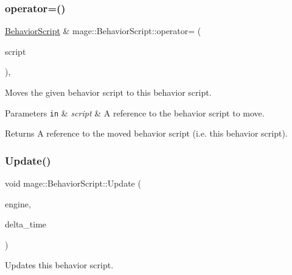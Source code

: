 \subsubsection{\texorpdfstring{operator=()}{operator=()}\hspace{0.1cm}{\footnotesize\ttfamily [2/2]}}
{\footnotesize\ttfamily \hyperlink{classmage_1_1_behavior_script}{Behavior\+Script} \& mage\+::\+Behavior\+Script\+::operator= (\begin{DoxyParamCaption}\item[{\hyperlink{classmage_1_1_behavior_script}{Behavior\+Script} \&\&}]{script }\end{DoxyParamCaption})\hspace{0.3cm}{\ttfamily [default]}, {\ttfamily [noexcept]}}

Moves the given behavior script to this behavior script.


\begin{DoxyParams}[1]{Parameters}
\mbox{\tt in}  & {\em script} & A reference to the behavior script to move. \\
\hline
\end{DoxyParams}
\begin{DoxyReturn}{Returns}
A reference to the moved behavior script (i.\+e. this behavior script). 
\end{DoxyReturn}
\hypertarget{classmage_1_1_behavior_script_a1211b9f6a3cdc79ea6cd5fa0344a31c8}{}\label{classmage_1_1_behavior_script_a1211b9f6a3cdc79ea6cd5fa0344a31c8} 
\subsubsection{\texorpdfstring{Update()}{Update()}}
{\footnotesize\ttfamily void mage\+::\+Behavior\+Script\+::\+Update (\begin{DoxyParamCaption}\item[{\mbox{[}\mbox{[}maybe\+\_\+unused\mbox{]} \mbox{]} \hyperlink{classmage_1_1_engine}{Engine} \&}]{engine,  }\item[{\mbox{[}\mbox{[}maybe\+\_\+unused\mbox{]} \mbox{]} \hyperlink{namespacemage_ad26233bbec640deda836e572c1a23708}{F64}}]{delta\+\_\+time }\end{DoxyParamCaption})\hspace{0.3cm}{\ttfamily [virtual]}}

Updates this behavior script.

